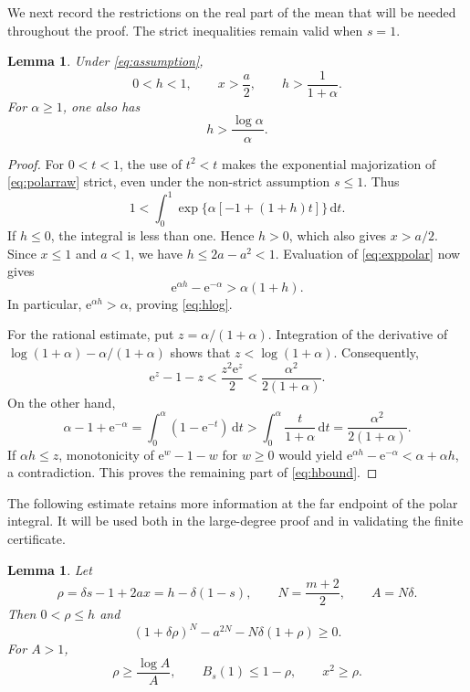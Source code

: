 \documentclass[11pt,letterpaper,reqno]{amsart}
\newtheorem{lem}[thm]{Lemma}
\theoremstyle{definition}
\numberwithin{equation}{section}
\newcommand{\dd}{\,\mathrm d}
\newcommand{\e}{\mathrm e}
\begin{document}
We next record the restrictions on the real part of the mean that will be needed throughout the proof. The strict inequalities remain valid when $s=1$.

\begin{lem}\label{lem:h}
Under \eqref{eq:assumption},
\begin{equation}\label{eq:hbound}
 0<h<1,\qquad x>\frac a2,\qquad
 h>\frac1{1+\alpha}.
\end{equation}
For $\alpha\ge1$, one also has
\begin{equation}\label{eq:hlog}
 h>\frac{\log\alpha}{\alpha}.
\end{equation}
\end{lem}

\begin{proof}
For $0<t<1$, the use of $t^2<t$ makes the exponential majorization of \eqref{eq:polarraw} strict, even under the non-strict assumption $s\le1$. Thus
\begin{equation}\label{eq:exppolar}
 1<\int_0^1\exp\{\alpha[-1+(1+h)t]\}\dd t.
\end{equation}
If $h\le0$, the integral is less than one. Hence $h>0$, which also gives $x>a/2$. Since $x\le1$ and $a<1$, we have $h\le2a-a^2<1$. Evaluation of \eqref{eq:exppolar} now gives
\[
 \e^{\alpha h}-\e^{-\alpha}>\alpha(1+h).
\]
In particular, $\e^{\alpha h}>\alpha$, proving \eqref{eq:hlog}.

For the rational estimate, put $z=\alpha/(1+\alpha)$. Integration of the derivative of $\log(1+\alpha)-\alpha/(1+\alpha)$ shows that $z<\log(1+\alpha)$. Consequently,
\[
 \e^z-1-z<\frac{z^2\e^z}{2}
       <\frac{\alpha^2}{2(1+\alpha)}.
\]
On the other hand,
\[
 \alpha-1+\e^{-\alpha}
 =\int_0^\alpha(1-\e^{-t})\dd t
 >\int_0^\alpha\frac{t}{1+\alpha}\dd t
 =\frac{\alpha^2}{2(1+\alpha)}.
\]
If $\alpha h\le z$, monotonicity of $\e^w-1-w$ for $w\ge0$ would yield
$\e^{\alpha h}-\e^{-\alpha}<\alpha+\alpha h$, a contradiction. This proves the remaining part of \eqref{eq:hbound}.
\end{proof}

The following estimate retains more information at the far endpoint of the polar integral. It will be used both in the large-degree proof and in validating the finite certificate.

\begin{lem}\label{lem:gap}
Let
\[
 \rho=\delta s-1+2ax=h-\delta(1-s),\qquad
 N=\frac{m+2}{2},\qquad A=N\delta.
\]
Then $0<\rho\le h$ and
\begin{equation}\label{eq:chordpolar}
 (1+\delta\rho)^N-a^{2N}-N\delta(1+\rho)\ge0.
\end{equation}
For $A>1$,
\begin{equation}\label{eq:rhobounds}
 \rho\ge\frac{\log A}{A},\qquad
 B_s(1)\le1-\rho,\qquad x^2\ge\rho.
\end{equation}
\end{lem}
\end{document}
